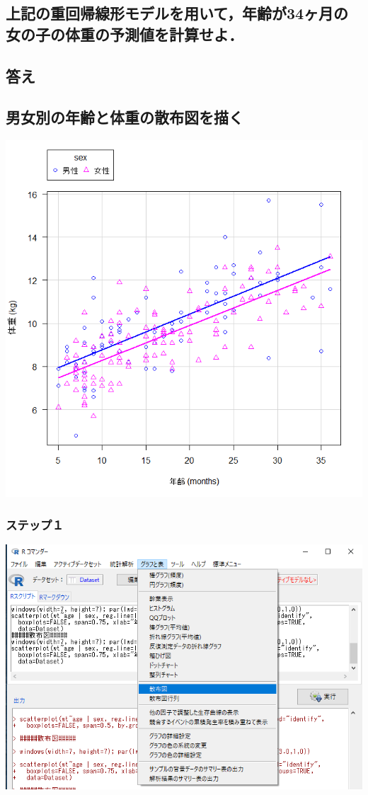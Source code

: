 \documentclass[11pt,]{problemset}
\begin{document}
\newpage

\vfill

\subsection{上記の重回帰線形モデルを用いて，年齢が34ヶ月の女の子の体重の予測値を計算せよ．}\label{34}

\subsection{答え}\label{-5}

\bigskip\bigskip\bigskip\bigskip\bigskip
\bigskip\bigskip\bigskip\bigskip\bigskip

\subsection{男女別の年齢と体重の散布図を描く}

\begin{center}\includegraphics[width=0.5\linewidth]{pic/scatter02} \end{center}

\subsubsection{ステップ１}\label{-12}

\begin{center}\includegraphics[width=0.5\linewidth,height=0.5\textheight]{pic/scatter03} \end{center}
\end{document}
